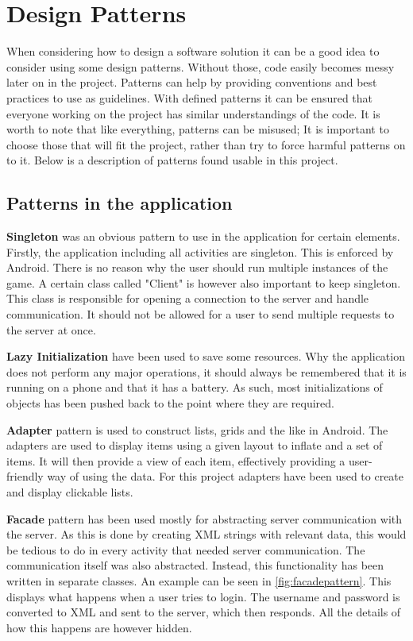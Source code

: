 \section{Design Patterns}
When considering how to design a software solution it can be a good idea to consider using some design patterns. Without those, code easily becomes messy later on in the project. Patterns can help by providing conventions and best practices to use as guidelines. With defined patterns it can be ensured that everyone working on the project has similar understandings of the code. It is worth to note that like everything, patterns can be misused; It is important to choose those that will fit the project, rather than try to force harmful patterns on to it. Below is a description of patterns found usable in this project.

\subsection{Patterns in the application}
 
\textbf{Singleton} was an obvious pattern to use in the application for certain elements. Firstly, the application including all activities are singleton. This is enforced by Android. There is no reason why the user should run multiple instances of the game. A certain class called "Client" is however also important to keep singleton. This class is responsible for opening a connection to the server and handle communication. It should not be allowed for a user to send multiple requests to the server at once.

\textbf{Lazy Initialization} have been used to save some resources. Why the application does not perform any major operations, it should always be remembered that it is running on a phone and that it has a battery. As such, most initializations of objects has been pushed back to the point where they are required.

\textbf{Adapter} pattern is used to construct lists, grids and the like in Android. The adapters are used to display items using a given layout to inflate and a set of items. It will then provide a view of each item, effectively providing a user-friendly way of using the data. For this project adapters have been used to create and display clickable lists.

\textbf{Facade} pattern has been used mostly for abstracting server communication with the server. As this is done by creating XML strings with relevant data, this would be tedious to do in every activity that needed server communication. The communication itself was also abstracted. Instead, this functionality has been written in separate classes. An example can be seen in \ref{fig:facadepattern}. This displays what happens when a user tries to login. The username and password is converted to XML and sent to the server, which then responds. All the details of how this happens are however hidden.

